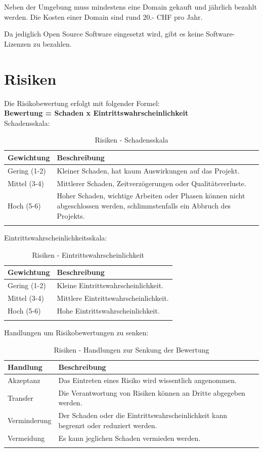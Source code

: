 Neben der Umgebung muss mindestens eine Domain gekauft und jährlich bezahlt
werden. Die Kosten einer Domain sind rund 20.- CHF pro Jahr.

Da jediglich Open Source Software eingesetzt wird, gibt es keine
Software-Lizenzen zu bezahlen.



\clearpage
\section{Risiken}\label{risiken}

Die Risikobewertung erfolgt mit folgender Formel:\\

\textbf{Bewertung = Schaden x Eintrittswahrscheinlichkeit}\\

\noindent
Schadensskala:

\begin{longtable}[]{@{}lp{11cm}@{}}
  \toprule
  \textbf{Gewichtung} & \textbf{Beschreibung}\tabularnewline
  \midrule
  \endhead
  Gering (1-2)        & Kleiner Schaden, hat kaum Auswirkungen auf das Projekt.\tabularnewline
  Mittel (3-4)        & Mittlerer Schaden, Zeitverzögerungen oder Qualitätsverluste.\tabularnewline
  Hoch (5-6)          & Hoher Schaden, wichtige Arbeiten oder Phasen können nicht abgeschlossen werden, schlimmstenfalls ein Abbruch des Projekts.\tabularnewline
  \bottomrule
  \caption{Risiken - Schadensskala}
\end{longtable}

\noindent
Eintrittswahrscheinlichkeitsskala:

\begin{longtable}[]{@{}lp{12cm}@{}}
  \toprule
  \textbf{Gewichtung} & \textbf{Beschreibung}\tabularnewline
  \midrule
  \endhead
  Gering (1-2)        & Kleine Eintrittswahrscheinlichkeit.\tabularnewline
  Mittel (3-4)        & Mittlere Eintrittswahrscheinlichkeit.\tabularnewline
  Hoch (5-6)          & Hohe Eintrittswahrscheinlichkeit.\tabularnewline
  \bottomrule
  \caption{Risiken - Eintrittswahrscheinlichkeit}
\end{longtable}

\noindent
Handlungen um Risikobewertungen zu senken:

\begin{longtable}[]{@{}lp{12cm}@{}}
  \toprule
  \textbf{Handlung} & \textbf{Beschreibung}\tabularnewline
  \midrule
  \endhead
  Akzeptanz         & Das Eintreten eines Risiko wird wissentlich angenommen.\tabularnewline
  Transfer          & Die Verantwortung von Risiken können an Dritte abgegeben werden.\tabularnewline
  Verminderung      & Der Schaden oder die Eintrittswahrscheinlichkeit kann begrenzt oder reduziert werden.\tabularnewline
  Vermeidung        & Es kann jeglichen Schaden vermieden werden.\tabularnewline
  \bottomrule
  \caption{Risiken - Handlungen zur Senkung der Bewertung}
\end{longtable}


